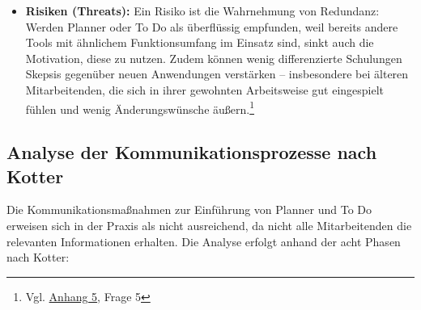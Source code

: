 \documentclass[
    12pt, 
    a4paper,
    ]{scrartcl} %
\begin{document}
\begin{itemize}
    \item \textbf{Risiken (Threats):} Ein Risiko ist die Wahrnehmung von Redundanz: Werden Planner oder To Do als überflüssig empfunden, weil bereits andere Tools mit ähnlichem Funktionsumfang im Einsatz sind, sinkt auch die Motivation, diese zu nutzen. Zudem können wenig differenzierte Schulungen Skepsis gegenüber neuen Anwendungen verstärken – insbesondere bei älteren Mitarbeitenden, die sich in ihrer gewohnten Arbeitsweise gut eingespielt fühlen und wenig Änderungswünsche äußern.\footnote{Vgl. \hyperref[sec:Anhang5]{Anhang 5}, Frage 5} 
  \end{itemize}
\subsection{Analyse der Kommunikationsprozesse nach Kotter}
Die Kommunikationsmaßnahmen zur Einführung von Planner und To Do erweisen sich in der Praxis als nicht ausreichend, da nicht alle Mitarbeitenden die relevanten Informationen erhalten. Die Analyse erfolgt anhand der acht Phasen nach Kotter:
\end{document}
